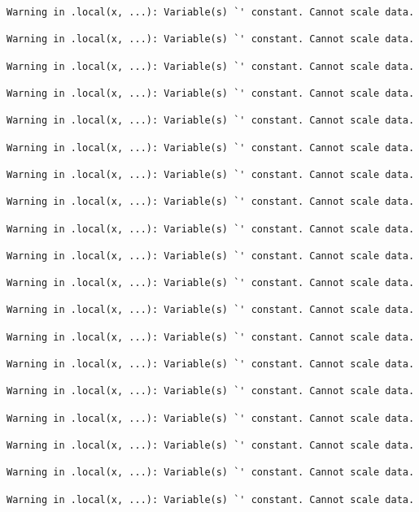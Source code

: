 \documentclass[
  letterpaper,
  DIV=11,
  numbers=noendperiod]{scrartcl}
\newenvironment{Shaded}{\begin{snugshade}}{\end{snugshade}}
\newcommand{\AttributeTok}[1]{\textcolor[rgb]{0.40,0.45,0.13}{#1}}
\newcommand{\DecValTok}[1]{\textcolor[rgb]{0.68,0.00,0.00}{#1}}
\newcommand{\FunctionTok}[1]{\textcolor[rgb]{0.28,0.35,0.67}{#1}}
\newcommand{\NormalTok}[1]{\textcolor[rgb]{0.00,0.23,0.31}{#1}}
\newcommand{\OtherTok}[1]{\textcolor[rgb]{0.00,0.23,0.31}{#1}}
\newcommand{\SpecialCharTok}[1]{\textcolor[rgb]{0.37,0.37,0.37}{#1}}
\newcommand{\StringTok}[1]{\textcolor[rgb]{0.13,0.47,0.30}{#1}}
\begin{document}
\begin{verbatim}
Warning in .local(x, ...): Variable(s) `' constant. Cannot scale data.

Warning in .local(x, ...): Variable(s) `' constant. Cannot scale data.

Warning in .local(x, ...): Variable(s) `' constant. Cannot scale data.

Warning in .local(x, ...): Variable(s) `' constant. Cannot scale data.

Warning in .local(x, ...): Variable(s) `' constant. Cannot scale data.

Warning in .local(x, ...): Variable(s) `' constant. Cannot scale data.

Warning in .local(x, ...): Variable(s) `' constant. Cannot scale data.

Warning in .local(x, ...): Variable(s) `' constant. Cannot scale data.

Warning in .local(x, ...): Variable(s) `' constant. Cannot scale data.

Warning in .local(x, ...): Variable(s) `' constant. Cannot scale data.

Warning in .local(x, ...): Variable(s) `' constant. Cannot scale data.

Warning in .local(x, ...): Variable(s) `' constant. Cannot scale data.

Warning in .local(x, ...): Variable(s) `' constant. Cannot scale data.

Warning in .local(x, ...): Variable(s) `' constant. Cannot scale data.

Warning in .local(x, ...): Variable(s) `' constant. Cannot scale data.

Warning in .local(x, ...): Variable(s) `' constant. Cannot scale data.

Warning in .local(x, ...): Variable(s) `' constant. Cannot scale data.

Warning in .local(x, ...): Variable(s) `' constant. Cannot scale data.

Warning in .local(x, ...): Variable(s) `' constant. Cannot scale data.
\end{verbatim}

\begin{Shaded}
\end{Shaded}
\end{document}
